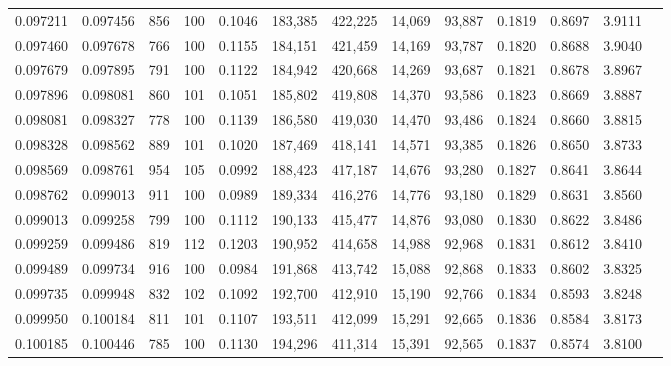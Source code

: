 \begin{tabular}{rrrrrrrrrrrrr}
0.097211 & 0.097456 &   856 & 100 &                                     0.1046 & 183,385 & 422,225 &  14,069 &  93,887 & 0.1819 & 0.8697 & 3.9111 \\
0.097460 & 0.097678 &   766 & 100 &                                     0.1155 & 184,151 & 421,459 &  14,169 &  93,787 & 0.1820 & 0.8688 & 3.9040 \\
0.097679 & 0.097895 &   791 & 100 &                                     0.1122 & 184,942 & 420,668 &  14,269 &  93,687 & 0.1821 & 0.8678 & 3.8967 \\
0.097896 & 0.098081 &   860 & 101 &                                     0.1051 & 185,802 & 419,808 &  14,370 &  93,586 & 0.1823 & 0.8669 & 3.8887 \\
0.098081 & 0.098327 &   778 & 100 &                                     0.1139 & 186,580 & 419,030 &  14,470 &  93,486 & 0.1824 & 0.8660 & 3.8815 \\
0.098328 & 0.098562 &   889 & 101 &                                     0.1020 & 187,469 & 418,141 &  14,571 &  93,385 & 0.1826 & 0.8650 & 3.8733 \\
0.098569 & 0.098761 &   954 & 105 &                                     0.0992 & 188,423 & 417,187 &  14,676 &  93,280 & 0.1827 & 0.8641 & 3.8644 \\
0.098762 & 0.099013 &   911 & 100 &                                     0.0989 & 189,334 & 416,276 &  14,776 &  93,180 & 0.1829 & 0.8631 & 3.8560 \\
0.099013 & 0.099258 &   799 & 100 &                                     0.1112 & 190,133 & 415,477 &  14,876 &  93,080 & 0.1830 & 0.8622 & 3.8486 \\
0.099259 & 0.099486 &   819 & 112 &                                     0.1203 & 190,952 & 414,658 &  14,988 &  92,968 & 0.1831 & 0.8612 & 3.8410 \\
0.099489 & 0.099734 &   916 & 100 &                                     0.0984 & 191,868 & 413,742 &  15,088 &  92,868 & 0.1833 & 0.8602 & 3.8325 \\
0.099735 & 0.099948 &   832 & 102 &                                     0.1092 & 192,700 & 412,910 &  15,190 &  92,766 & 0.1834 & 0.8593 & 3.8248 \\
0.099950 & 0.100184 &   811 & 101 &                                     0.1107 & 193,511 & 412,099 &  15,291 &  92,665 & 0.1836 & 0.8584 & 3.8173 \\
0.100185 & 0.100446 &   785 & 100 &                                     0.1130 & 194,296 & 411,314 &  15,391 &  92,565 & 0.1837 & 0.8574 & 3.8100 \\

\end{tabular}

